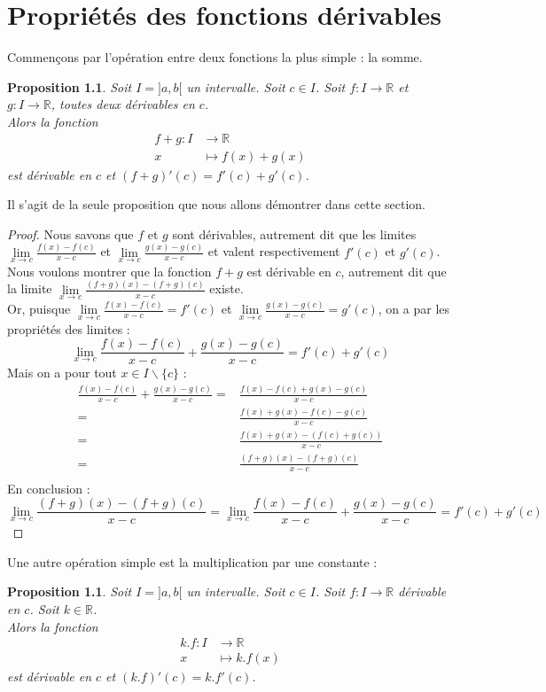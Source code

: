 \documentclass[a4paper,fontsize=13pt]{scrreprt}
\theoremstyle{plain}
\newtheorem{pro}[subsection]{Proposition}
\theoremstyle{definition}
\newcommand{\rr}{\mathbb{R}}
\begin{document}
\chapter{Propriétés des fonctions dérivables}

Commençons par l'opération entre deux fonctions la plus simple : la somme.

\begin{pro} \label{dersomme}
	Soit $I = ]a,b[$ un intervalle. Soit $c \in I$. Soit $f : I \to \rr$ et $g : I \to \rr$, toutes deux dérivables en $c$. \\
	Alors la fonction
	\begin{align*}
	f+g : I &\to \rr \\
	x &\mapsto f(x)+g(x)
	\end{align*}
	est dérivable en $c$ et $(f+g)'(c)=f'(c)+g'(c)$.
\end{pro}
Il s'agit de la seule proposition que nous allons démontrer dans cette section.
\begin{proof}
	Nous savons que $f$ et $g$ sont dérivables, autrement dit que les limites $\lim\limits_{x \to c} \frac{f(x)-f(c)}{x-c}$ et $\lim\limits_{x \to c} \frac{g(x)-g(c)}{x-c}$ et valent respectivement $f'(c)$ et $g'(c)$. \\
	Nous voulons montrer que la fonction $f+g$ est dérivable en $c$, autrement dit que la limite $\lim\limits_{x \to c} \frac{(f+g)(x)-(f+g)(c)}{x-c}$ existe. \\
	Or, puisque $\lim\limits_{x \to c} \frac{f(x)-f(c)}{x-c}=f'(c)$ et $\lim\limits_{x \to c} \frac{g(x)-g(c)}{x-c}=g'(c)$, on a par les propriétés des limites :
	$$\lim\limits_{x \to c} \frac{f(x)-f(c)}{x-c} + \frac{g(x)-g(c)}{x-c} = f'(c) + g'(c)$$
	Mais on a pour tout $x \in I \backslash \{c\}$ :
	\begin{align*}
	\frac{f(x)-f(c)}{x-c} + \frac{g(x)-g(c)}{x-c} =& \frac{f(x)-f(c)+g(x)-g(c)}{x-c} \\
	=& \frac{f(x)+g(x)-f(c)-g(c)}{x-c} \\
	=& \frac{f(x)+g(x)-(f(c)+g(c))}{x-c} \\
	=& \frac{(f+g)(x)-(f+g)(c)}{x-c} \\
	\end{align*}
	En conclusion :
	$$\lim\limits_{x \to c} \frac{(f+g)(x)-(f+g)(c)}{x-c} = \lim\limits_{x \to c} \frac{f(x)-f(c)}{x-c} + \frac{g(x)-g(c)}{x-c} = f'(c) + g'(c)$$
\end{proof}
Une autre opération simple est la multiplication par une constante :
\begin{pro} \label{derconst}
	Soit $I = ]a,b[$ un intervalle. Soit $c \in I$. Soit $f : I \to \rr$ dérivable en $c$. Soit $k \in \rr$.\\
	Alors la fonction
	\begin{align*}
	k.f : I &\to \rr \\
	x &\mapsto k.f(x)
	\end{align*}
	est dérivable en $c$ et $(k.f)'(c)=k.f'(c)$.
\end{pro}
\end{document}
